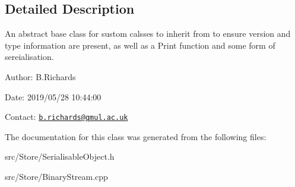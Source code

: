 \subsection{Detailed Description}
An abstract base class for sustom calsses to inherit from to ensure version and type information are present, as well as a Print function and some form of sereialisation.

\begin{DoxyParagraph}{Author\-:}
B.\-Richards 
\end{DoxyParagraph}
\begin{DoxyParagraph}{Date\-:}
2019/05/28 10\-:44\-:00 
\end{DoxyParagraph}
Contact\-: \href{mailto:b.richards@qmul.ac.uk}{\tt b.\-richards@qmul.\-ac.\-uk} 

The documentation for this class was generated from the following files\-:\begin{DoxyCompactItemize}
\item 
src/\-Store/Serialisable\-Object.\-h\item 
src/\-Store/Binary\-Stream.\-cpp\end{DoxyCompactItemize}
